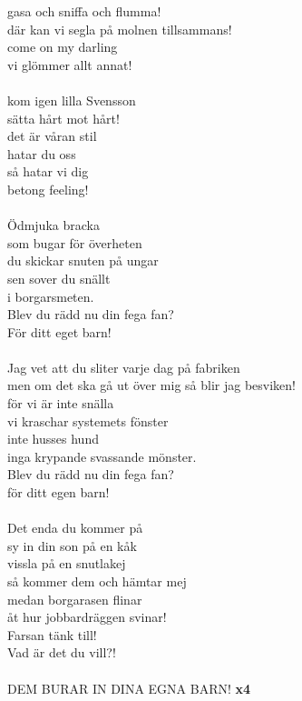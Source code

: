 gasa och sniffa och flumma!\\
där kan vi segla på molnen tillsammans!\\
come on my darling\\
vi glömmer allt annat!\\
\\
kom igen lilla Svensson\\
sätta hårt mot hårt!\\
det är våran stil\\
hatar du oss\\
så hatar vi dig\\
betong feeling!\\
\\
Ödmjuka bracka\\
som bugar för överheten\\
du skickar snuten på ungar\\
sen sover du snällt\\
i borgarsmeten.\\
Blev du rädd nu din fega fan?\\
För ditt eget barn!\\
\\
Jag vet att du sliter varje dag på fabriken\\
men om det ska gå ut över mig så blir jag besviken!\\
för vi är inte snälla\\
vi kraschar systemets fönster\\
inte husses hund\\
inga krypande svassande mönster.\\
Blev du rädd nu din fega fan?\\
för ditt egen barn!\\
\\
Det enda du kommer på\\
sy in din son på en kåk\\
vissla på en snutlakej\\
så kommer dem och hämtar mej\\
medan borgarasen flinar\\
åt hur jobbardräggen svinar!\\
Farsan tänk till!\\
Vad är det du vill?!\\
\\
DEM BURAR IN DINA EGNA BARN! \textbf{x4}
